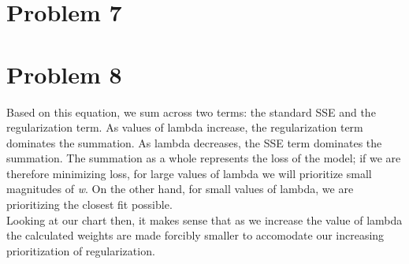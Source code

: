 \documentclass[journal]{IEEEtran}
\begin{document}
\section{Problem 7}

\medskip

\section{Problem 8}
\noindent Based on this equation, we sum across two terms: the standard SSE
and the regularization term. As values of lambda increase, the regularization
term dominates the summation. As lambda decreases, the SSE term dominates the
summation. The summation as a whole represents the loss of the model; if we
are therefore minimizing loss, for large values of lambda we will prioritize
small magnitudes of \textit{w}. On the other hand, for small values of lambda,
we are prioritizing the closest fit possible. \\

\noindent Looking at our chart then, it makes sense that as we increase the
value of lambda the calculated weights are made forcibly smaller to accomodate
our increasing prioritization of regularization. \newline
\medskip

 
\end{document}
